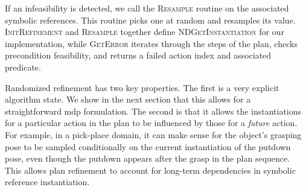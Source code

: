 If an infeasibility is detected, we call the \textsc{Resample} routine on the
associated symbolic references. This routine picks one at random and
resamples its value. \textsc{InitRefinement} and \textsc{Resample} together define
\textsc{NDGetInstantiation} for our implementation, while \textsc{GetError} iterates
through the steps of the plan, checks precondition feasibility, and returns
a failed action index and associated predicate.

Randomized refinement has two key properties. The first is a very
explicit algorithm state.  We show in the next section that this
allows for a straightforward {\sc mdp} formulation. The second is that
it allows the instantiations for a particular action in the plan to be
influenced by those for a \emph{future} action. For example, in a
pick-place domain, it can make sense for the object's grasping pose to
be sampled conditionally on the current instantiation of the putdown
pose, even though the putdown appears after the grasp in the plan
sequence. This allows plan refinement to account for long-term
dependencies in symbolic reference instantiation.
